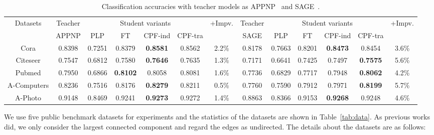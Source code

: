 \documentclass[sigconf]{acmart}
\begin{document}
\begin{table*}[ht]
\centering
\caption{Classification accuracies with teacher models as APPNP~\cite{klicpera2018predict} and SAGE~\cite{hamilton2017inductive}.}
\label{tab:acc2}
\begin{tabular}{|c|c|c|c|c|c|c||c|c|c|c|c|c|}
\hline
\multirow{2}{*}{Datasets} & Teacher & \multicolumn{4}{c|}{Student variants}               & \multirow{2}{*}{+Impv.} & Teacher & \multicolumn{4}{c|}{Student variants}               & \multirow{2}{*}{+Impv.} \\ \cline{2-6} \cline{8-12}
                          & APPNP   & PLP    & FT     & CPF-ind         & CPF-tra         &                         & SAGE    & PLP    & FT     & CPF-ind         & CPF-tra         &                         \\ \hline
Cora                      & 0.8398  & 0.7251 & 0.8379 & \textbf{0.8581} & 0.8562          & 2.2\%                   & 0.8178  & 0.7663 & 0.8201 & \textbf{0.8473} & 0.8454          & 3.6\%                   \\ \hline
Citeseer                  & 0.7547  & 0.6812 & 0.7580 & \textbf{0.7646} & 0.7635          & 1.3\%                   & 0.7171  & 0.6641 & 0.7425 & 0.7497          & \textbf{0.7575} & 5.6\%                   \\ \hline
Pubmed                    & 0.7950  & 0.6866 & \textbf{0.8102} & 0.8058          & 0.8081 & 1.6\%                   & 0.7736  & 0.6829 & 0.7717 & 0.7948          & \textbf{0.8062} & 4.2\%                   \\ \hline
A-Computers               & 0.8236  & 0.7516 & 0.8176 & \textbf{0.8279} & 0.8211          & 0.5\%                   & 0.7760  & 0.7590 & 0.7912 & 0.7971          & \textbf{0.8199} & 5.7\%                   \\ \hline
A-Photo                   & 0.9148  & 0.8469 & 0.9241 & \textbf{0.9273} & 0.9272          & 1.4\%                   & 0.8863  & 0.8366 & 0.9153 & \textbf{0.9268} & 0.9248          & 4.6\%                   \\ \hline
\end{tabular}
\end{table*}
We use five public benchmark datasets for experiments and the statistics of the datasets are shown in Table~\ref{tab:data}. As previous works~\cite{shchur2018pitfalls,klicpera2019diffusion,sun2020multi} did, we only consider the largest connected component and regard the edges as undirected. The details about the datasets are as follows: 
\end{document}
